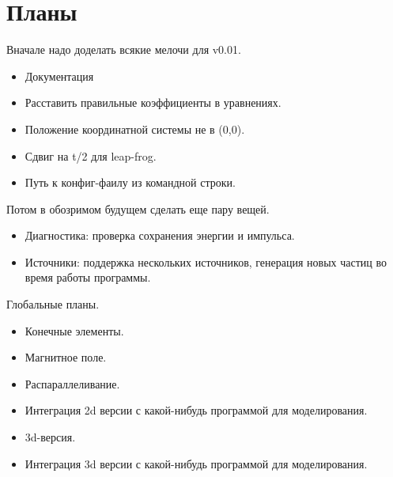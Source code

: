 \section{ Планы }
Вначале надо доделать всякие мелочи для v0.01.
\begin{itemize}
\item Документация
\item Расставить правильные коэффициенты в уравнениях.
\item Положение координатной системы не в (0,0).
\item Сдвиг на t/2 для leap-frog.
\item Путь к конфиг-фаилу из командной строки.
\end{itemize}

Потом в обозримом будущем сделать еще пару вещей.
\begin{itemize}
\item Диагностика: проверка сохранения энергии и импульса.
\item Источники: поддержка нескольких источников, генерация новых частиц во время работы программы.
\end{itemize}

Глобальные планы.
\begin{itemize}
\item Конечные элементы.
\item Магнитное поле.
\item Распараллеливание.
\item Интеграция 2d версии с какой-нибудь программой для моделирования.
\item 3d-версия.
\item Интеграция 3d версии с какой-нибудь программой для моделирования.
\end{itemize}



